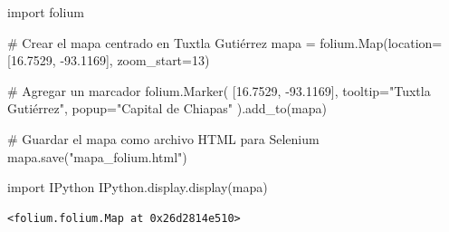 \documentclass[
  letterpaper,
  DIV=11,
  numbers=noendperiod]{scrreprt}
\newenvironment{Shaded}{\begin{snugshade}}{\end{snugshade}}
\newcommand{\CommentTok}[1]{\textcolor[rgb]{0.37,0.37,0.37}{#1}}
\newcommand{\DecValTok}[1]{\textcolor[rgb]{0.68,0.00,0.00}{#1}}
\newcommand{\FloatTok}[1]{\textcolor[rgb]{0.68,0.00,0.00}{#1}}
\newcommand{\ImportTok}[1]{\textcolor[rgb]{0.00,0.46,0.62}{#1}}
\newcommand{\NormalTok}[1]{\textcolor[rgb]{0.00,0.23,0.31}{#1}}
\newcommand{\OperatorTok}[1]{\textcolor[rgb]{0.37,0.37,0.37}{#1}}
\newcommand{\StringTok}[1]{\textcolor[rgb]{0.13,0.47,0.30}{#1}}
\begin{document}
\begin{Shaded}
\begin{Highlighting}[]
\ImportTok{import}\NormalTok{ folium}

\CommentTok{\# Crear el mapa centrado en Tuxtla Gutiérrez}
\NormalTok{mapa }\OperatorTok{=}\NormalTok{ folium.Map(location}\OperatorTok{=}\NormalTok{[}\FloatTok{16.7529}\NormalTok{, }\OperatorTok{{-}}\FloatTok{93.1169}\NormalTok{], zoom\_start}\OperatorTok{=}\DecValTok{13}\NormalTok{)}

\CommentTok{\# Agregar un marcador}
\NormalTok{folium.Marker(}
\NormalTok{    [}\FloatTok{16.7529}\NormalTok{, }\OperatorTok{{-}}\FloatTok{93.1169}\NormalTok{],}
\NormalTok{    tooltip}\OperatorTok{=}\StringTok{"Tuxtla Gutiérrez"}\NormalTok{,}
\NormalTok{    popup}\OperatorTok{=}\StringTok{"Capital de Chiapas"}
\NormalTok{).add\_to(mapa)}

\CommentTok{\# Guardar el mapa como archivo HTML para Selenium}
\NormalTok{mapa.save(}\StringTok{"mapa\_folium.html"}\NormalTok{)}
\end{Highlighting}
\end{Shaded}

\begin{Shaded}
\begin{Highlighting}[]
\ImportTok{import}\NormalTok{ IPython}
\NormalTok{IPython.display.display(mapa)}
\end{Highlighting}
\end{Shaded}

\begin{verbatim}
<folium.folium.Map at 0x26d2814e510>
\end{verbatim}
\end{document}
